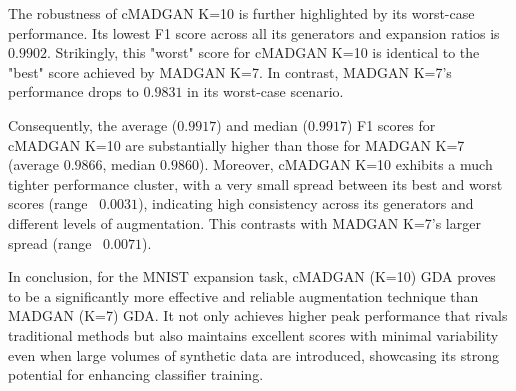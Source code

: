 The robustness of cMADGAN K=10 is further highlighted by its worst-case performance. Its lowest F1 score across all its generators and expansion ratios is $0.9902$. Strikingly, this "worst" score for cMADGAN K=10 is identical to the "best" score achieved by MADGAN K=7. In contrast, MADGAN K=7's performance drops to $0.9831$ in its worst-case scenario.

Consequently, the average ($0.9917$) and median ($0.9917$) F1 scores for cMADGAN K=10 are substantially higher than those for MADGAN K=7 (average $0.9866$, median $0.9860$). Moreover, cMADGAN K=10 exhibits a much tighter performance cluster, with a very small spread between its best and worst scores (range ~$0.0031$), indicating high consistency across its generators and different levels of augmentation. This contrasts with MADGAN K=7's larger spread (range ~$0.0071$).

In conclusion, for the MNIST expansion task, cMADGAN (K=10) GDA proves to be a significantly more effective and reliable augmentation technique than MADGAN (K=7) GDA. It not only achieves higher peak performance that rivals traditional methods but also maintains excellent scores with minimal variability even when large volumes of synthetic data are introduced, showcasing its strong potential for enhancing classifier training.


